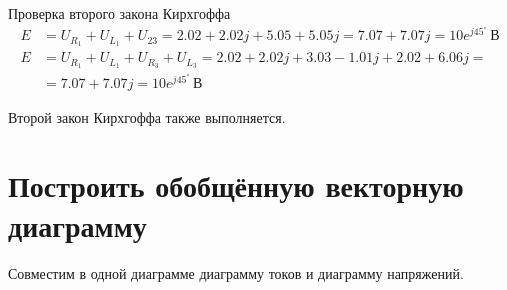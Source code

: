 \documentclass[12pt]{article}
\begin{document}
Проверка второго закона Кирхгоффа
\begin{equation*}
  \begin{aligned}
    E &= U_{R_1} + U_{L_1} + U_{23} = 2.02 + 2.02j + 5.05 + 5.05j = 7.07 + 7.07j = 10e^{j45^\circ}\,\text{В} \\
    E &= U_{R_1} + U_{L_1} + U_{R_3} + U_{L_3} = 2.02 + 2.02j + 3.03 - 1.01j + 2.02 + 6.06j = \\
      &= 7.07 + 7.07j = 10e^{j45^\circ}\,\text{В} 
  \end{aligned}
\end{equation*}

Второй закон Кирхгоффа также выполняется.

\newpage

\section{Построить обобщённую векторную диаграмму}

Совместим в одной диаграмме диаграмму токов и диаграмму напряжений.
\end{document}
